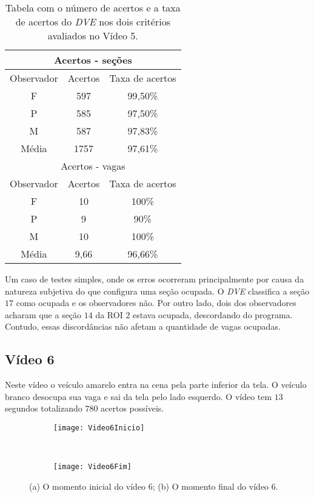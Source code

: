 \begin{table}[H]
\begin{center}
\begin{tabular}{|c||c||c|}
\hline
\multicolumn{3}{|c|}{Acertos - seções}  \\ \hline
Observador & Acertos & Taxa de acertos \\ \hline
F & 597 & 99,50\% \\  \hline
P & 585 & 97,50\% \\ \hline
M & 587 & 97,83\% \\ \hline
Média & 1757 & 97,61\% \\
\hline
\hline
\multicolumn{3}{|c|}{Acertos - vagas}  \\ \hline \hline
Observador & Acertos & Taxa de acertos \\ \hline
F & 10 & 100\% \\  \hline
P & 9 & 90\% \\ \hline
M & 10 & 100\% \\ \hline
Média & 9,66 & 96,66\% \\
\hline
\end{tabular}
\end{center}
\caption{Tabela com o número de acertos e a taxa de acertos do \textit{DVE} nos dois critérios avaliados no Vídeo 5.}
\label{tab:rvideo5}
\end{table}


Um caso de testes simples, onde os erros ocorreram principalmente por causa da natureza subjetiva do que configura uma seção ocupada. O \textit{DVE} classifica a seção $17$ como ocupada e os observadores não. Por outro lado, dois dos observadores acharam que a seção $14$ da ROI $2$ estava ocupada, descordando do programa. Contudo, essas discordâncias não afetam a quantidade de vagas ocupadas.

\subsection{Vídeo 6}

Neste vídeo o veículo amarelo entra na cena pela parte inferior da tela. O veículo branco desocupa sua vaga e sai da tela pelo lado esquerdo. O vídeo tem $13$ segundos totalizando $780$ acertos possíveis.

\begin{figure}[H]
\centering
\begin{subfigure}{.5\textwidth}
\centering
\texttt{[image: Video6Inicio]}
\caption{}
\end{subfigure}\
\begin{subfigure}{.5\textwidth}
\centering
\texttt{[image: Video6Fim]}
\caption{}
\end{subfigure}
\centering
\caption{(a) O momento inicial do vídeo 6; (b) O momento final do vídeo 6.}%
\label{}%
\end{figure}

